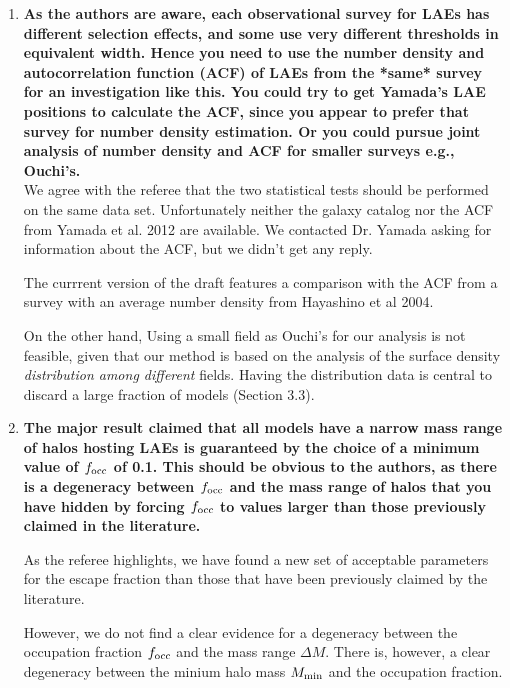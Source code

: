 \documentclass[12pts]{article}
\begin{document}
\begin{enumerate}
\item {\bf As the authors are aware, each observational survey for LAEs has
  different selection effects, and some use very different thresholds
  in equivalent width.  Hence you need to use the number density and
  autocorrelation function (ACF) of LAEs from the *same* survey for an
  investigation like this.  You could try to get Yamada's LAE
  positions to calculate the ACF, since you appear to prefer that
  survey for number density estimation.  Or you could pursue joint
  analysis of number density and ACF for smaller surveys e.g.,
  Ouchi's. }\\


  We agree with the referee that the two statistical tests should be
  performed on the same data set. Unfortunately neither the galaxy catalog
  nor the ACF from Yamada et al. 2012 are available. We contacted
  Dr. Yamada asking for information about the ACF, but we didn't get
  any reply.  

  The currrent version of the draft features a comparison with the ACF
  from a survey with an average number density from Hayashino et al
  2004. 

  On the other hand, Using a small field as Ouchi's for our analysis
  is not feasible, given that our method is based on the analysis of
  the surface density \emph{distribution among different}
  fields. Having the distribution data is central to discard a large
  fraction of models (Section 3.3).


\item {\bf 
  The major result claimed that all models have a narrow mass range
  of halos hosting LAEs is guaranteed by the choice of a minimum
  value of $f_{\rm occ}$ of 0.1.  This should be obvious to the authors, as
  there is a degeneracy between $f_{\rm occ}$ and the mass range of halos
  that you have hidden by forcing $f_{\rm occ}$ to values larger than those
  previously claimed in the literature. }


  As the referee highlights, we have found a new set of acceptable
  parameters for the escape fraction than those that have been
  previously claimed by the literature.

  However, we do not find a clear evidence for a degeneracy between
  the occupation fraction $f_{\rm occ}$ and the mass range $\Delta
  M$. There is, however, a clear degeneracy between the minium halo
  mass $M_{\rm min}$ and the occupation fraction. 


\end{enumerate}
\end{document}
